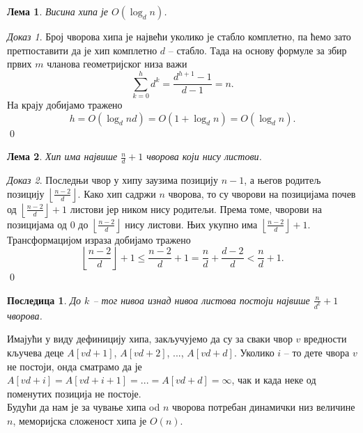 \documentclass[11pt, a4paper]{article}
\newtheorem{lema}{\selectlanguage{russian} Лема} [subsection]
\newtheorem{posledicaL}{\selectlanguage{russian} Последица} [lema]
\theoremstyle{remark}
\newtheorem*{dokaz}{\selectlanguage{russian} Доказ}
\numberwithin{equation}{section}
\begin{document}
	\begin{lema}
		\normalfont Висина хипа је $O(\log_d n)$.
	\end{lema}
	\begin{dokaz}
		Број чворова хипа је највећи уколико је стабло комплетно, па ћемо зато претпоставити да је хип комплетно $d$ -- стабло. Тада на основу формуле за збир првих $m$ чланова геометријског низа важи \\
		\begin{equation}
		\sum_{k=0}^{h} d^k=\frac{d^{h+1}-1}{d-1}=n.
		\end{equation}
		На крају добијамо тражено
		\begin{equation}
			h=O(\log_d nd)=O(1+\log_d{n})=O(\log_d n).
		\end{equation}
		\qed
	\end{dokaz}
	\begin{lema}
		\normalfont Хип има највише $\frac{n}{d}+1$ чворова који нису листови.
	\end{lema}
	\begin{dokaz}
		Последњи чвор у хипу заузима позицију $n-1$, а његов родитељ позицију $\left \lfloor \frac{n-2}{d} \right \rfloor$. Како хип садржи $n$ чворова, то су чворови на позицијама почев од $\left \lfloor \frac{n-2}{d} \right \rfloor +1$ листови јер ником нису родитељи. Према томе, чворови на позицијама од $0$ до $\left \lfloor \frac{n-2}{d} \right \rfloor$ нису листови. Њих укупно има $\left \lfloor \frac{n-2}{d} \right \rfloor +1$. Трансформацијом израза добијамо тражено
		\begin{equation}
		\left \lfloor \frac{n-2}{d} \right \rfloor +1 \leq \frac{n-2}{d} +1 = \frac{n}{d}+\frac{d-2}{d} < \frac{n}{d} +1.
		\end{equation}
		\qed
	\end{dokaz}
	\begin{posledicaL}
		\normalfont До $k$ -- тог нивоа изнад нивоа листова постоји највише $\frac{n}{d^{k}}+1$ чворова.
	\end{posledicaL}

	\bigbreak

	\indent Имајући у виду дефиницију хипа, закључујемо да су за сваки чвор $v$ вредности кључева деце $A[vd+1]$, $A[vd+2]$, ..., $A[vd+d]$. Уколико $i$ -- то дете чвора $v$ не постоји, онда сматрамо да је $A[vd+i]=A[vd+i+1]=...=A[vd+d]=\infty$, чак и када неке од поменутих позиција не постоје. \\
	\indent Будући да нам је за чување хипа od $n$ чворова потребан динамички низ величине $n$, меморијска сложеност хипа је $O(n)$.
\end{document}

